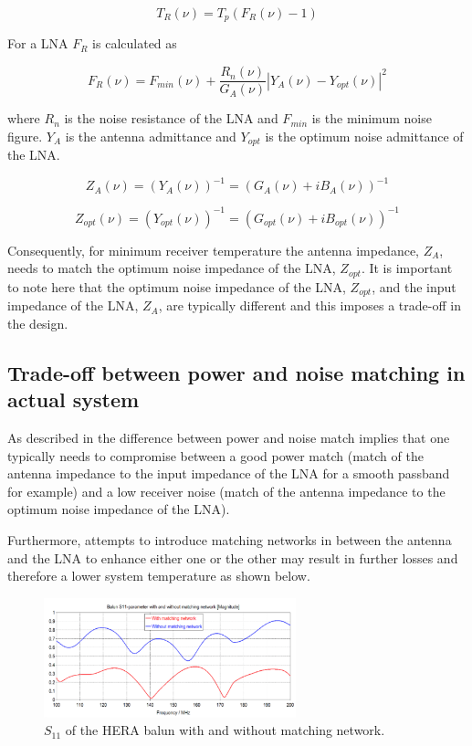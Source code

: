 \documentclass[11pt]{article}
\begin{document}
\begin{equation}
T_R(\nu) = T_p(F_R(\nu)-1)
\end{equation}

For a LNA $F_R$ is calculated as

\begin{equation}
F_R(\nu) = F_{min}(\nu)+\frac{R_n(\nu)}{G_A(\nu)}|Y_A(\nu)-Y_{opt}(\nu)|^2
\end{equation}

where $R_n$ is the noise resistance of the LNA and $F_{min}$ is the minimum noise figure. $Y_A$ is the antenna admittance and $Y_{opt}$ is the optimum noise admittance of the LNA. 

\begin{equation}
Z_A(\nu) = (Y_A(\nu))^{-1}= (G_A(\nu)+iB_A(\nu))^{-1}
\end{equation}

\begin{equation}
Z_{opt}(\nu) = (Y_{opt}(\nu))^{-1}= (G_{opt}(\nu)+iB_{opt}(\nu))^{-1}
\end{equation}

Consequently, for minimum receiver temperature the antenna impedance, $Z_A$, needs to match the optimum noise impedance of the LNA, $Z_{opt}$. It is important to note here that the optimum noise impedance of the LNA, $Z_{opt}$, and the input impedance of the LNA, $Z_A$, are typically different and this imposes a trade-off in the design.

\subsection{Trade-off between power and noise matching in actual system}

As described in \citep{Fagnoni16} the difference between power and noise match implies that one typically needs to compromise between a good power match (match of the antenna impedance to the input impedance of the LNA for a smooth passband for example) and a low receiver noise (match of the antenna impedance to the optimum noise impedance of the LNA). 

Furthermore, attempts to introduce matching networks in between the antenna and the LNA to enhance either one or the other may result in further losses and therefore a lower system temperature as shown below. 

\begin{figure}[ht]
\centering
\includegraphics[width=0.65\textwidth]{S11_balun.png}
\caption{\small $S_{11}$ of the HERA balun with and without matching network.}
\label{Fig:S11_balun}
\end{figure}
\end{document}

